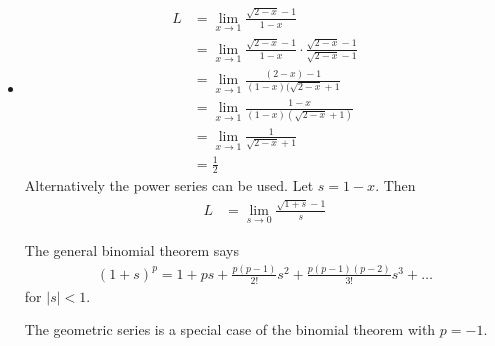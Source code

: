 \begin{ex} \mbox \\
\begin{itemize}
\item
\begin{align*}
L & = \lim_{x \to 1} \frac{\sqrt{2-x} -1}{1-x} \\
 & = \lim_{x \to 1} \frac{\sqrt{2-x}-1}{1-x} \cdot \frac{\sqrt{2-x}-1}{\sqrt{2-x}-1} \\
& = \lim_{x \to 1} \frac{(2-x) -1}{(1-x)(\sqrt{2-x}+1} \\
& = \lim_{x \to 1} \frac{1-x}{(1-x)\left(\sqrt{2-x}+1\right)} \\ 
& = \lim_{x \to 1} \frac 1 {\sqrt{2-x} +1} \\
 & = \frac 1 2
\end{align*}
Alternatively the power series can be used. Let $s= 1-x$. Then
\begin{align*}
L & = \lim_{s \to 0} \frac{\sqrt{1+s}-1} s
\end{align*}
\begin{tm}
The general binomial theorem says
\begin{align*}
(1+s)^p = 1+ps + \frac{p(p-1)}{2!} s^2 + \frac{p(p-1)(p-2)}{3!} s^3 + \dots
\end{align*}
for $|s|<1$.
\end{tm}
The geometric series is a special case of the binomial theorem with $p=-1$.


\end{itemize}
\end{ex}
